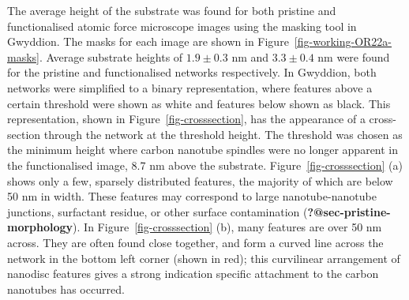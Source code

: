 \documentclass[
  a4paper,
]{scrbook}
\begin{document}
The average height of the substrate was found for both pristine and
functionalised atomic force microscope images using the masking tool in
Gwyddion. The masks for each image are shown in
Figure~\ref{fig-working-OR22a-masks}. Average substrate heights of
\(1.9\pm0.3\) nm and \(3.3\pm0.4\) nm were found for the pristine and
functionalised networks respectively. In Gwyddion, both networks were
simplified to a binary representation, where features above a certain
threshold were shown as white and features below shown as black. This
representation, shown in Figure~\ref{fig-crosssection}, has the
appearance of a cross-section through the network at the threshold
height. The threshold was chosen as the minimum height where carbon
nanotube spindles were no longer apparent in the functionalised image,
8.7 nm above the substrate. Figure~\ref{fig-crosssection} (a) shows only
a few, sparsely distributed features, the majority of which are below 50
nm in width. These features may correspond to large nanotube-nanotube
junctions, surfactant residue, or other surface contamination
(\textbf{?@sec-pristine-morphology}). In Figure~\ref{fig-crosssection}
(b), many features are over 50 nm across. They are often found close
together, and form a curved line across the network in the bottom left
corner (shown in red); this curvilinear arrangement of nanodisc features
gives a strong indication specific attachment to the carbon nanotubes
has occurred.
\end{document}

